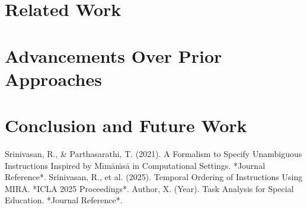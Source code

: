 \documentclass[a4paper,11pt]{lmcs}
\begin{document}
\section{Related Work}
\label{sec:related}

\section{Advancements Over Prior Approaches}
\label{sec:advancements}

\section{Conclusion and Future Work}
\label{sec:conclude}

\begin{thebibliography}{9}
Srinivasan, R., \& Parthasarathi, T. (2021). A Formalism to Specify Unambiguous Instructions Inspired by Mīmāṁsā in Computational Settings. *Journal Reference*.
Srinivasan, R., et al. (2025). Temporal Ordering of Instructions Using MIRA. *ICLA 2025 Proceedings*.
Author, X. (Year). Task Analysis for Special Education. *Journal Reference*.
\end{thebibliography}
\end{document}
